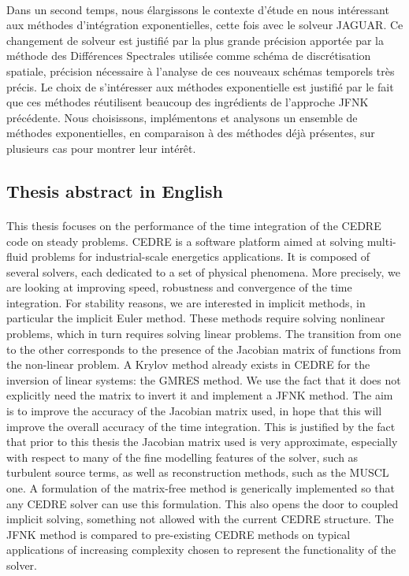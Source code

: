     \paragraph{}
    Dans un second temps, nous élargissons le contexte d'étude en nous intéressant aux méthodes d'intégration exponentielles, cette fois avec le solveur JAGUAR.
    Ce changement de solveur est justifié par la plus grande précision apportée par la méthode des Différences Spectrales utilisée comme schéma de discrétisation spatiale, précision nécessaire à l'analyse de ces nouveaux schémas temporels très précis.
    Le choix de s'intéresser aux méthodes exponentielle est justifié par le fait que ces méthodes réutilisent beaucoup des ingrédients de l'approche JFNK précédente.
    Nous choisissons, implémentons et analysons un ensemble de méthodes exponentielles, en comparaison à des méthodes déjà présentes, sur plusieurs cas pour montrer leur intérêt.


  \pagebreak
  \subsection*{Thesis abstract in English}

    \paragraph{}
    This thesis focuses on the performance of the time integration of the CEDRE code on steady problems.
    CEDRE is a software platform aimed at solving multi-fluid problems for industrial-scale energetics applications.
    It is composed of several solvers, each dedicated to a set of physical phenomena.
    More precisely, we are looking at improving speed, robustness and convergence of the time integration.
    For stability reasons, we are interested in implicit methods, in particular the implicit Euler method.
    These methods require solving nonlinear problems, which in turn requires solving linear problems.
    The transition from one to the other corresponds to the presence of the Jacobian matrix of functions from the non-linear problem.
    A Krylov method already exists in CEDRE for the inversion of linear systems: the GMRES method.
    We use the fact that it does not explicitly need the matrix to invert it and implement a JFNK method.
    The aim is to improve the accuracy of the Jacobian matrix used, in hope that this will improve the overall accuracy of the time integration.
    This is justified by the fact that prior to this thesis the Jacobian matrix used is very approximate, especially with respect to many of the fine modelling features of the solver, such as turbulent source terms, as well as reconstruction methods, such as the MUSCL one.
    A formulation of the matrix-free method is generically implemented so that any CEDRE solver can use this formulation.
    This also opens the door to coupled implicit solving, something not allowed with the current CEDRE structure.
    The JFNK method is compared to pre-existing CEDRE methods on typical applications of increasing complexity chosen to represent the functionality of the solver.

